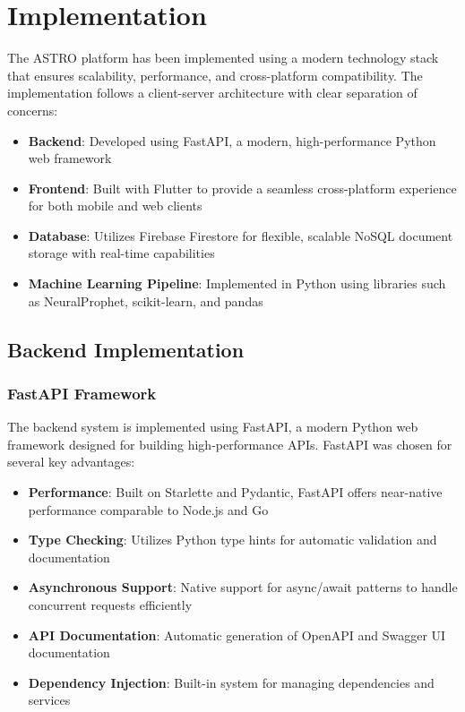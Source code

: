 \chapter{Implementation}



The ASTRO platform has been implemented using a modern technology stack that ensures scalability, performance, and cross-platform compatibility. The implementation follows a client-server architecture with clear separation of concerns:

\begin{itemize}
    \item \textbf{Backend}: Developed using FastAPI, a modern, high-performance Python web framework
    \item \textbf{Frontend}: Built with Flutter to provide a seamless cross-platform experience for both mobile and web clients
    \item \textbf{Database}: Utilizes Firebase Firestore for flexible, scalable NoSQL document storage with real-time capabilities
    \item \textbf{Machine Learning Pipeline}: Implemented in Python using libraries such as NeuralProphet, scikit-learn, and pandas
\end{itemize}
\section{Backend Implementation}

\subsection{FastAPI Framework}

The backend system is implemented using FastAPI, a modern Python web framework designed for building high-performance APIs. FastAPI was chosen for several key advantages:

\begin{itemize}
    \item \textbf{Performance}: Built on Starlette and Pydantic, FastAPI offers near-native performance comparable to Node.js and Go
    \item \textbf{Type Checking}: Utilizes Python type hints for automatic validation and documentation
    \item \textbf{Asynchronous Support}: Native support for async/await patterns to handle concurrent requests efficiently
    \item \textbf{API Documentation}: Automatic generation of OpenAPI and Swagger UI documentation
    \item \textbf{Dependency Injection}: Built-in system for managing dependencies and services
\end{itemize}

